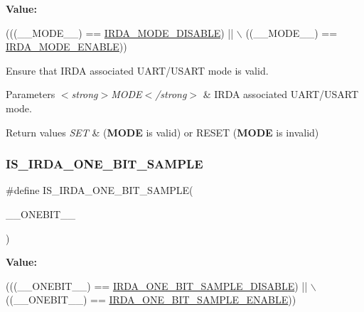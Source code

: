 {\bfseries Value\+:}
\begin{DoxyCode}
(((\_\_MODE\_\_) == \hyperlink{group___i_r_d_a___mode_gaaa2d9e9ccafff98bcbb3744c149d2146}{IRDA\_MODE\_DISABLE}) || \(\backslash\)
                                 ((\_\_MODE\_\_) == \hyperlink{group___i_r_d_a___mode_gad13d47ff38029e1b137334b505d72cb8}{IRDA\_MODE\_ENABLE}))
\end{DoxyCode}


Ensure that I\+R\+DA associated U\+A\+R\+T/\+U\+S\+A\+RT mode is valid. 


\begin{DoxyParams}{Parameters}
{\em $<$strong$>$\+M\+O\+D\+E$<$/strong$>$} & I\+R\+DA associated U\+A\+R\+T/\+U\+S\+A\+RT mode. \\
\hline
\end{DoxyParams}

\begin{DoxyRetVals}{Return values}
{\em S\+ET} & ({\bfseries M\+O\+DE} is valid) or R\+E\+S\+ET ({\bfseries M\+O\+DE} is invalid) \\
\hline
\end{DoxyRetVals}
\mbox{\label{group___i_r_d_a___private___macros_ga6bb7d320c0f8800d4cb5750cf24bf760}} 
\subsubsection{\texorpdfstring{I\+S\+\_\+\+I\+R\+D\+A\+\_\+\+O\+N\+E\+\_\+\+B\+I\+T\+\_\+\+S\+A\+M\+P\+LE}{IS\_IRDA\_ONE\_BIT\_SAMPLE}}
{\footnotesize\ttfamily \#define I\+S\+\_\+\+I\+R\+D\+A\+\_\+\+O\+N\+E\+\_\+\+B\+I\+T\+\_\+\+S\+A\+M\+P\+LE(\begin{DoxyParamCaption}\item[{}]{\+\_\+\+\_\+\+O\+N\+E\+B\+I\+T\+\_\+\+\_\+ }\end{DoxyParamCaption})}

{\bfseries Value\+:}
\begin{DoxyCode}
(((\_\_ONEBIT\_\_) == \hyperlink{group___i_r_d_a___one___bit_ga373ec0d11671c4a4d2d2c0dd646d976c}{IRDA\_ONE\_BIT\_SAMPLE\_DISABLE}) || \(\backslash\)
                                                 ((\_\_ONEBIT\_\_) == 
      \hyperlink{group___i_r_d_a___one___bit_ga0ff275354a873d6f9a37e982a7fdd1da}{IRDA\_ONE\_BIT\_SAMPLE\_ENABLE}))
\end{DoxyCode}


